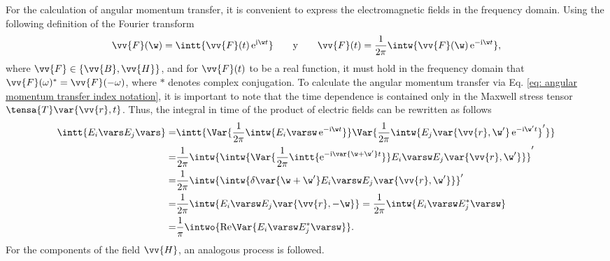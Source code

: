 For the calculation of angular momentum transfer, it is convenient to express the electromagnetic fields in the frequency domain. Using the following definition of the Fourier transform
\begin{equation}
\vv{F}(\w) = \intt{\vv{F}(t)\,{\rm e}^{{\rm i} \w t}} \qquad \text{y} \qquad \vv{F}(t) = \frac{1}{2\pi}\intw{\vv{F}(\w)\,{\rm e}^{-{\rm i} \w t}},
\end{equation}
where $\vv{F}\in \{ \vv{B}, \vv{H}\}$, and for $\vv{F}(t)$ to be a real function, it must hold in the frequency domain that $\vv{F}(\omega)^{*}=\vv{F}(-\omega)$, where $*$ denotes complex conjugation. To calculate the angular momentum transfer via Eq. \eqref{eq: angular momentum transfer index notation}, it is important to note that the time dependence is contained only in the Maxwell stress tensor $\tensa{T}\var{\vv{r},t}$. Thus, the integral in time of the product of electric fields can be rewritten as follows
\begin{align}
\intt{E_i\vars E_j \vars} =& \intt{\Var{\frac{1}{2\pi}\intw{E_i\varsw \,{\rm e}^{-{\rm i} \w t} }} \Var{\frac{1}{2\pi}\intw{E_j\var{\vv{r},\w^{\prime}} \,{\rm e}^{-{\rm i} \w^{\prime} t} }^{\prime}} } \nonumber\\
=&\frac{1}{2\pi} \intw{\intw{\Var{\frac{1}{2\pi}\intt{{\rm e}^{-{\rm i}\var{\w+\w^{\prime}} t}}} E_i \varsw E_j\var{\vv{r},\w^{\prime}}}}^{\prime} \nonumber\\
=&\frac{1}{2\pi}\intw{\intw{\delta\var{\w+\w^{\prime}} E_i \varsw E_j\var{\vv{r},\w^{\prime}} }}^{\prime} \nonumber\\
=&\frac{1}{2\pi}\intw{ E_i \varsw E_j\var{\vv{r},-\w} }=\frac{1}{2\pi}\intw{ E_i \varsw E_j^{*}\varsw } \nonumber\\
=&\frac{1}{\pi}\intwo{{\rm Re}\Var{E_i\varsw E_j^{*}\varsw}}.
\end{align}
For the components of the field $\vv{H}$, an analogous process is followed.

